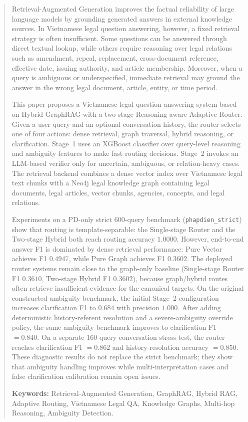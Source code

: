 \documentclass[11pt,twocolumn]{article}
\begin{document}
\begin{abstract}
Retrieval-Augmented Generation improves the factual
reliability of large language models by grounding generated
answers in external knowledge sources. In Vietnamese legal
question answering, however, a fixed retrieval strategy is
often insufficient. Some questions can be answered through
direct textual lookup, while others require reasoning over
legal relations such as amendment, repeal, replacement,
cross-document reference, effective date, issuing authority,
and article membership. Moreover, when a query is ambiguous
or underspecified, immediate retrieval may ground the answer
in the wrong legal document, article, entity, or time period.

This paper proposes a Vietnamese legal question answering
system based on Hybrid GraphRAG with a two-stage
Reasoning-aware Adaptive Router. Given a user query and an
optional conversation history, the router selects one of four
actions: dense retrieval, graph traversal, hybrid reasoning,
or clarification. Stage~1 uses an XGBoost classifier over
query-level reasoning and ambiguity features to make fast
routing decisions. Stage~2 invokes an LLM-based verifier only
for uncertain, ambiguous, or relation-heavy cases. The
retrieval backend combines a dense vector index over
Vietnamese legal text chunks with a Neo4j legal knowledge
graph containing legal documents, legal articles, vector
chunks, agencies, concepts, and legal relations.

Experiments on a PD-only strict $600$-query benchmark
(\texttt{phapdien\_strict}) show that routing is
template-separable: the Single-stage Router and the
Two-stage Hybrid both reach routing accuracy $1.0000$.
However, end-to-end answer F1 is dominated by dense retrieval
performance: Pure Vector achieves F1 $0.4947$, while Pure Graph
achieves F1 $0.3602$. The deployed router systems remain close
to the graph-only baseline (Single-stage Router F1 $0.3610$,
Two-stage Hybrid F1 $0.3602$), because graph/hybrid routes
often retrieve insufficient evidence for the canonical targets.
On the original constructed ambiguity benchmark, the initial
Stage~2 configuration increases clarification F1 to $0.684$
with precision $1.000$. After adding deterministic
history-referent resolution and a severe-ambiguity override
policy, the same ambiguity benchmark improves to
clarification F1 $=0.840$. On a separate
$160$-query conversation stress test, the router reaches
clarification F1 $=0.862$ and history-resolution accuracy
$=0.850$. These diagnostic results do not replace the strict
benchmark; they show that ambiguity handling improves while
multi-interpretation cases and false clarification calibration
remain open issues.

\textbf{Keywords:} Retrieval-Augmented Generation,
GraphRAG, Hybrid RAG, Adaptive Routing, Vietnamese Legal QA,
Knowledge Graphs, Multi-hop Reasoning, Ambiguity Detection.
\end{abstract}
\end{document}
